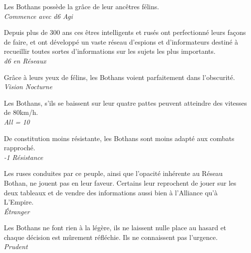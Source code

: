 \begin{description}[align=left]
\item [Agilité du Félin] 			%
		Les Bothans possède la grâce de leur ancêtres félins.\\
		\emph{Commence avec d6 Agi}

\item [Service de renseignement] 	%
		Depuis plus de 300 ans ces êtres intelligents et rusés ont perfectionné leurs façons de faire, et ont développé un vaste réseau d’espions et d’informateurs destiné à recueillir toutes sortes d’informations sur les sujets les plus importants.\\
		\emph{d6 en Réseaux}

\item [Comme en plein jour] 		%
		Grâce à leurs yeux de félins, les Bothans voient parfaitement dans l’obscurité.\\
		\emph{Vision Nocturne}

\item [Déplacement rapide] 			%
		Les Bothans, s’ils se baissent sur leur quatre pattes peuvent atteindre des vitesses de 80km/h.\\
		\emph{All = 10}

\item [Frêle] 						%
		De constitution moins résistante, les Bothans sont moins adapté aux combats rapproché.\\
		\emph{-1 Résistance}

\item [Mauvaise réputation] 		%
		Les ruses conduites par ce peuple, ainsi que l’opacité inhérente au Réseau Bothan, ne jouent pas en leur faveur. Certains leur reprochent de jouer sur les deux tableaux et de vendre des informations aussi bien à l’Alliance qu’à L’Empire.\\
		\emph{\'Etranger}

\item [Prudent] 					%
		Les Bothans ne font rien à la légère, ils ne laissent nulle place au hasard et chaque décision est mûrement réfléchie. Ils ne connaissent pas l’urgence.\\
		\emph{Prudent}
\end{description}